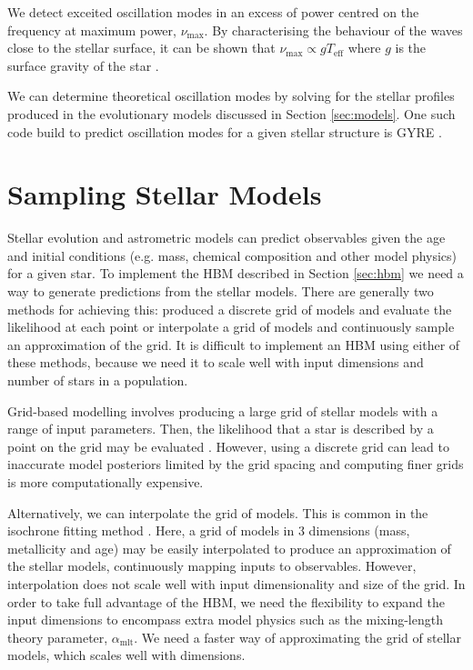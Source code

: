 
We detect exceited oscillation modes in an excess of power centred on the frequency at maximum power, $\nu_\mathrm{max}$. By characterising the behaviour of the waves close to the stellar surface, it can be shown that $\nu_\mathrm{max} \propto g T_\mathrm{eff}$ where $g$ is the surface gravity of the star \citep{Kjeldsen.Bedding1995}.

We can determine theoretical oscillation modes by solving for the stellar profiles produced in the evolutionary models discussed in Section \ref{sec:models}. One such code build to predict oscillation modes for a given stellar structure is GYRE \citep{Townsend.Teitler2013}. 

\section{Sampling Stellar Models}

Stellar evolution and astrometric models can predict observables given the age and initial conditions (e.g. mass, chemical composition and other model physics) for a given star. To implement the HBM described in Section \ref{sec:hbm} we need a way to generate predictions from the stellar models. There are generally two methods for achieving this: produced a discrete grid of models and evaluate the likelihood at each point or interpolate a grid of models and continuously sample an approximation of the grid. It is difficult to implement an HBM using either of these methods, because we need it to scale well with input dimensions and number of stars in a population.

Grid-based modelling involves producing a large grid of stellar models with a range of input parameters. Then, the likelihood that a star is described by a point on the grid may be evaluated \citep[see e.g. BASTA][]{SilvaAguirre.Davies.ea2015}. However, using a discrete grid can lead to inaccurate model posteriors limited by the grid spacing and computing finer grids is more computationally expensive.

Alternatively, we can interpolate the grid of models. This is common in the isochrone fitting method \citep{}. Here, a grid of models in 3 dimensions (mass, metallicity and age) may be easily interpolated to produce an approximation of the stellar models, continuously mapping inputs to observables. However, interpolation does not scale well with input dimensionality and size of the grid. In order to take full advantage of the HBM, we need the flexibility to expand the input dimensions to encompass extra model physics such as the mixing-length theory parameter, $\alpha_\mathrm{mlt}$. We need a faster way of approximating the grid of stellar models, which scales well with dimensions.

